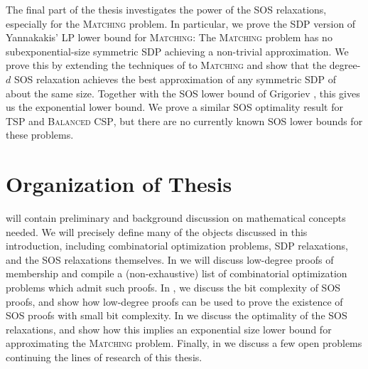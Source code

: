 The final part of the thesis investigates the power of the SOS relaxations, especially for the \textsc{Matching} problem. In particular, we prove the SDP version of Yannakakis' LP lower bound for \textsc{Matching}: The \textsc{Matching} problem has no subexponential-size symmetric SDP achieving a non-trivial approximation. We prove this by extending the techniques of \cite{LRST14} to \textsc{Matching} and show that the degree-$d$ SOS relaxation achieves the best approximation of any symmetric SDP  
of about the same size. Together with the SOS lower bound of Grigoriev \cite{Gri01}, this gives us the exponential lower bound. We prove a similar SOS optimality result for \textsc{TSP} and \textsc{Balanced CSP}, but there are no currently known SOS lower bounds for these problems. 

\section{Organization of Thesis}

 will contain preliminary and background discussion on mathematical concepts needed. We will precisely define many of the objects discussed in this introduction, including combinatorial optimization problems, SDP relaxations, and the SOS relaxations themselves. In  we will discuss low-degree proofs of membership and compile a (non-exhaustive) list of combinatorial optimization problems which admit such proofs. In , we discuss the bit complexity of SOS proofs, and show how low-degree proofs can be used to prove the existence of SOS proofs with small bit complexity. In  we discuss the optimality of the SOS relaxations, and show how this implies an exponential size lower bound for approximating the \textsc{Matching} problem. Finally, in  we discuss a few open problems continuing the lines of research of this thesis.



